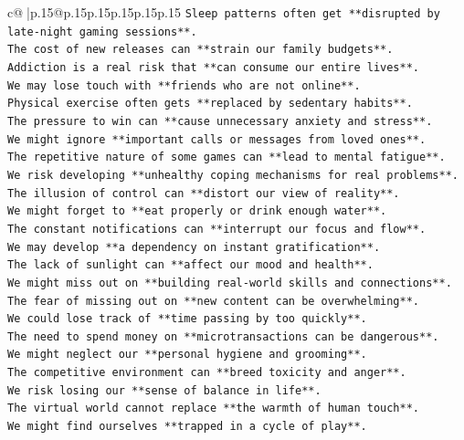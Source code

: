 \documentclass{article}
\begin{document}
{\begin{supertabular}{c@{$\;$}|p{.15\linewidth}@{}p{.15\linewidth}p{.15\linewidth}p{.15\linewidth}p{.15\linewidth}p{.15\linewidth}}
{{{\texttt{Sleep patterns often get **disrupted by late{-}night gaming sessions**.} \\
\texttt{The cost of new releases can **strain our family budgets**.} \\
\texttt{Addiction is a real risk that **can consume our entire lives**.} \\
\texttt{We may lose touch with **friends who are not online**.} \\
\texttt{Physical exercise often gets **replaced by sedentary habits**.} \\
\texttt{The pressure to win can **cause unnecessary anxiety and stress**.} \\
\texttt{We might ignore **important calls or messages from loved ones**.} \\
\texttt{The repetitive nature of some games can **lead to mental fatigue**.} \\
\texttt{We risk developing **unhealthy coping mechanisms for real problems**.} \\
\texttt{The illusion of control can **distort our view of reality**.} \\
\texttt{We might forget to **eat properly or drink enough water**.} \\
\texttt{The constant notifications can **interrupt our focus and flow**.} \\
\texttt{We may develop **a dependency on instant gratification**.} \\
\texttt{The lack of sunlight can **affect our mood and health**.} \\
\texttt{We might miss out on **building real{-}world skills and connections**.} \\
\texttt{The fear of missing out on **new content can be overwhelming**.} \\
\texttt{We could lose track of **time passing by too quickly**.} \\
\texttt{The need to spend money on **microtransactions can be dangerous**.} \\
\texttt{We might neglect our **personal hygiene and grooming**.} \\
\texttt{The competitive environment can **breed toxicity and anger**.} \\
\texttt{We risk losing our **sense of balance in life**.} \\
\texttt{The virtual world cannot replace **the warmth of human touch**.} \\
\texttt{We might find ourselves **trapped in a cycle of play**.} \\
}}}
\end{supertabular}}
\end{document}
